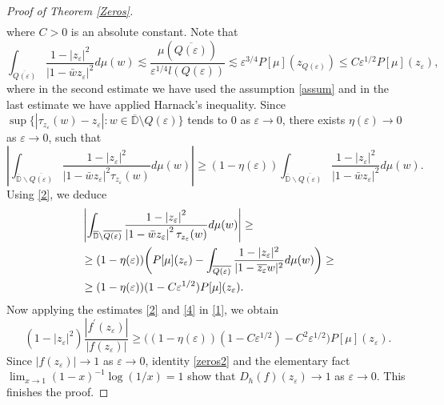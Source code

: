 \documentclass[a4paper,12pt]{article}
\theoremstyle{definition}
\numberwithin{equation}{section}
\newcommand{\D}{\mathbb D}
\begin{document}
\begin{proof}[Proof of Theorem \ref{Zeros}]
\begin{align}
\end{align}
where $C>0$ is an absolute constant. Note that
\begin{equation}
    \label{2}
    \int_{\overline{Q(\varepsilon)}} \frac{1-\left|z_{\varepsilon} \right|^{2}}{\left|1-\bar{w} z_\varepsilon \right|^{2}}  d \mu(w) \lesssim \frac{\mu (\overline{Q(\varepsilon)})}{\varepsilon^{1/4} l (Q(\varepsilon) )} \lesssim \varepsilon^{3/4} P[\mu] (z_{Q(\varepsilon)}) \leq C \varepsilon^{1/2} P[\mu] (z_{\varepsilon}),
\end{equation}
where in the second estimate we have used the assumption \eqref{assum} and in the last estimate we have applied Harnack's inequality. Since $\sup \{|\tau_{z_\varepsilon} (w) - z_\varepsilon| : w \in \overline{\D} \setminus Q(\varepsilon) \}$ tends to $0$ as $\varepsilon \to 0$, there exists $\eta(\varepsilon) \to 0$ as $\varepsilon \to 0$, such that 
\begin{equation*}
    \left|  \int_{\overline{\D} \backslash \overline{Q(\varepsilon)}} \frac{1-\left|z_{\varepsilon}\right|^{2}}{\left|1-\bar{w} z_{\varepsilon}\right|^{2} \tau_{z_\varepsilon} (w)} d \mu(w) \right| 
 \geqslant\left(1- \eta \left(\varepsilon \right)\right)   \int_{\overline{\D} \backslash \overline{Q(\varepsilon)}} \frac{1-\left|z_{\varepsilon}\right|^{2}}{\left|1-\bar{w} z_{\varepsilon}\right|^{2}} d \mu(w).  
\end{equation*}
Using \eqref{2}, we deduce 
\begin{align}
    \label{4}
& \left|  \int_{\overline{\D} \backslash \overline{Q(\varepsilon)}} \frac{1-\left|z_{\varepsilon}\right|^{2}}{\left|1-\bar{w} z_{\varepsilon}\right|^{2} \tau_{z_\varepsilon} (w)} d \mu(w) \right| 
 \geq  \\ \notag  & \geq (1- \eta (\varepsilon)) \bigg( P[\mu] (z_\varepsilon) - \int_{\overline{Q(\varepsilon)}} \frac{1-|z_\varepsilon|^2}{|1 - \overline{z_\varepsilon} w|^2} d \mu (w)\bigg)  
 \geq \\ \notag  & \geq (1 - \eta (\varepsilon)) (1 - C \varepsilon^{1/2}) P[\mu] (z_{\varepsilon}) .   
\end{align}
Now applying the estimates \eqref{2} and \eqref{4} in \eqref{1}, we obtain
\begin{equation}
    \label{5}
     \left(1-\left|z_{\varepsilon}\right|^{2}\right) \frac{\left|f^{\prime}\left(z_{\varepsilon}\right)\right|}{\left|f\left(z_{\varepsilon}\right)\right|} \geq \big( (1 - \eta (\varepsilon)) (1 - C \varepsilon^{1/2}) - C^2 \varepsilon^{1/2} \big) P [\mu] (z_\varepsilon). 
\end{equation}
Since $|f(z_\varepsilon)| \to 1$ as $\varepsilon \to 0$, identity \eqref{zeros2} and the elementary fact $\lim_{x \to 1} (1-x)^{-1} \log(1/x)  = 1$ show that $D_h (f) (z_\varepsilon) \to 1$ as $\varepsilon \to 0$. This finishes the proof. 


\end{proof}
\end{document}

